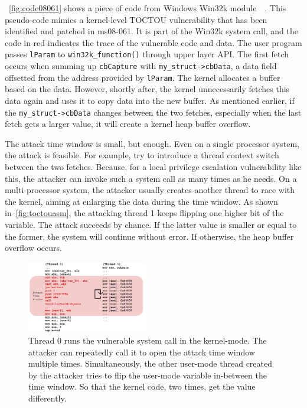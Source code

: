 ~\autoref{fig:code08061} shows a piece of code from Windows Win32k module~\cite{jurczyk2013identifying}~\cite{ms08061}. This pseudo-code mimics a kernel-level TOCTOU vulnerability that has been identified and patched in ms08-061. It is part of the Win32k system call, and the code in red indicates the trace of the vulnerable code and data.  The user program passes \texttt{lParam} to \texttt{win32k\_function()} through upper layer API.  The first fetch occurs when summing up \texttt{cbCapture} with \texttt{my\_struct->cbData}, a data field offsetted from the address provided by \texttt{lParam}. The kernel allocates a buffer based on the data. However, shortly after, the kernel unnecessarily fetches this data again and uses it to copy data into the new buffer. As mentioned earlier, if the  \texttt{my\_struct->cbData} changes between the two fetches, especially when the last fetch gets a larger value, it will create a kernel heap buffer overflow. 

The attack time window is small, but enough. Even on a single processor system, the attack is feasible. For example, try to introduce a thread context switch between the two fetches. Because, for a local privilege escalation vulnerability like this, the attacker can invoke such a system call as many times as he needs. On a multi-processor system, the attacker usually creates another thread to race with the kernel, aiming at enlarging the data during the time window. As shown in~\autoref{fig:toctouasm}, the attacking thread 1 keeps flipping one higher bit of the variable. The attack succeeds by chance. If the latter value is smaller or equal to the former, the system will continue without error. If otherwise, the heap buffer overflow occurs.




\begin{figure}[ht]
  \includegraphics[width=0.47\textwidth]{figures/toctouasm3}
  \centering
  \caption{Thread 0 runs the vulnerable system call in the kernel-mode. The attacker can repeatedly call it to open the attack time window multiple times. Simultaneously, the other user-mode thread created by the attacker tries to flip the user-mode variable in-between the time window. So that the kernel code, two times, get the value differently.}
  \label{fig:toctouasm}
\end{figure}


